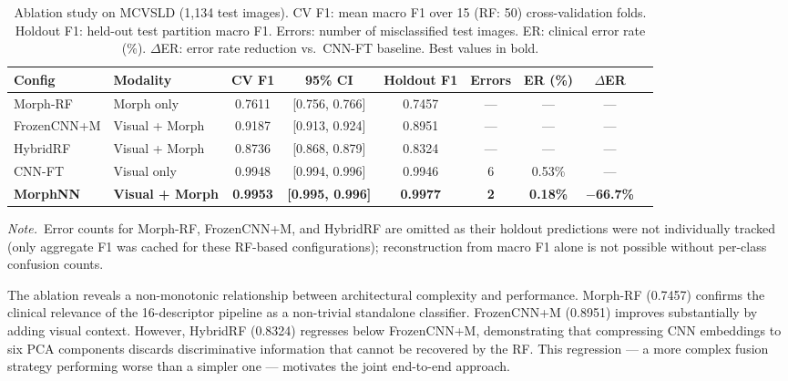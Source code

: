 \documentclass[preprint,12pt]{elsarticle}
\begin{document}
\begin{table}[htbp]
\centering
\caption{Ablation study on MCVSLD (1,134 test images).
  CV F1: mean macro F1 over 15 (RF: 50) cross-validation folds.
  Holdout F1: held-out test partition macro F1.
  Errors: number of misclassified test images.
  ER: clinical error rate (\%).
  $\Delta$ER: error rate reduction vs.\ CNN-FT baseline.
  Best values in bold.}
\label{tab:ablation}
\setlength{\tabcolsep}{4.5pt}
\renewcommand{\arraystretch}{1.12}
\begin{tabular}{llccccccc}
\toprule
\textbf{Config} & \textbf{Modality} &
  \textbf{CV F1} & \textbf{95\% CI} &
  \textbf{Holdout F1} &
  \textbf{Errors} & \textbf{ER (\%)} &
  \textbf{$\Delta$ER} \\
\midrule
Morph-RF    & Morph only        & 0.7611 & [0.756, 0.766] & 0.7457 & --- & --- & --- \\
FrozenCNN+M & Visual + Morph    & 0.9187 & [0.913, 0.924] & 0.8951 & --- & --- & --- \\
HybridRF    & Visual + Morph    & 0.8736 & [0.868, 0.879] & 0.8324 & --- & --- & --- \\
CNN-FT      & Visual only       & 0.9948 & [0.994, 0.996] & 0.9946 & 6 & 0.53\% & --- \\
\midrule
\textbf{MorphNN} & \textbf{Visual + Morph} &
  \textbf{0.9953} & \textbf{[0.995, 0.996]} &
  \textbf{0.9977} & \textbf{2} & \textbf{0.18\%} &
  $-$\textbf{66.7\%} \\
\bottomrule
\end{tabular}

\smallskip
\footnotesize
\textit{Note.}~Error counts for Morph-RF, FrozenCNN+M, and HybridRF are omitted as their
holdout predictions were not individually tracked (only aggregate F1 was cached for
these RF-based configurations); reconstruction from macro F1 alone is not
possible without per-class confusion counts.
\end{table}

The ablation reveals a non-monotonic relationship between architectural
complexity and performance.  Morph-RF (0.7457) confirms the clinical
relevance of the 16-descriptor pipeline as a non-trivial standalone
classifier.  FrozenCNN+M (0.8951) improves substantially by adding
visual context.  However, HybridRF (0.8324) regresses below FrozenCNN+M,
demonstrating that compressing CNN embeddings to six PCA components
discards discriminative information that cannot be recovered by the RF.
This regression --- a more complex fusion strategy performing worse than
a simpler one --- motivates the joint end-to-end approach.
\end{document}
